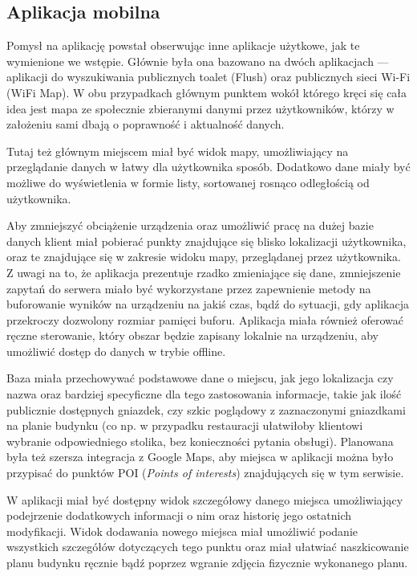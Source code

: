 \documentclass[polish,polish,a4paper,12pt]{article}
\begin{document}
	\subsection{Aplikacja mobilna}

	Pomysł na aplikację powstał obserwując inne aplikacje użytkowe, jak te wymienione we wstępie. Głównie była ona bazowano na dwóch aplikacjach — aplikacji do wyszukiwania publicznych toalet (Flush) oraz publicznych sieci Wi-Fi (WiFi Map). W obu przypadkach głównym punktem wokół którego kręci się cała idea jest mapa ze społecznie zbieranymi danymi przez użytkowników, którzy w założeniu sami dbają o poprawność i aktualność danych.

	Tutaj też głównym miejscem miał być widok mapy, umożliwiający na przeglądanie danych w łatwy dla użytkownika sposób. Dodatkowo dane miały być możliwe do wyświetlenia w formie listy, sortowanej rosnąco odległością od użytkownika.

	Aby zmniejszyć obciążenie urządzenia oraz umożliwić pracę na dużej bazie danych klient miał pobierać punkty znajdujące się blisko lokalizacji użytkownika, oraz te znajdujące się w zakresie widoku mapy, przeglądanej przez użytkownika. Z uwagi na to, że aplikacja prezentuje rzadko zmieniające się dane, zmniejszenie zapytań do serwera miało być wykorzystane przez zapewnienie metody na buforowanie wyników na urządzeniu na jakiś czas, bądź do sytuacji, gdy aplikacja przekroczy dozwolony rozmiar pamięci buforu. Aplikacja miała również oferować ręczne sterowanie, który obszar będzie zapisany lokalnie na urządzeniu, aby umożliwić dostęp do danych w trybie offline.

	Baza miała przechowywać podstawowe dane o miejscu, jak jego lokalizacja czy nazwa oraz bardziej specyficzne dla tego zastosowania informacje, takie jak ilość publicznie dostępnych gniazdek, czy szkic poglądowy z zaznaczonymi gniazdkami na planie budynku (co np. w przypadku restauracji ułatwiłoby klientowi wybranie odpowiedniego stolika, bez konieczności pytania obsługi). Planowana była też szersza integracja z Google Maps, aby miejsca w aplikacji można było przypisać do punktów POI (\textit{Points of interests}) znajdujących się w tym serwisie.

	W aplikacji miał być dostępny widok szczegółowy danego miejsca umożliwiający podejrzenie dodatkowych informacji o nim oraz historię jego ostatnich modyfikacji. Widok dodawania nowego miejsca miał umożliwić podanie wszystkich szczegółów dotyczących tego punktu oraz miał ułatwiać naszkicowanie planu budynku ręcznie bądź poprzez wgranie zdjęcia fizycznie wykonanego planu.
\end{document}
